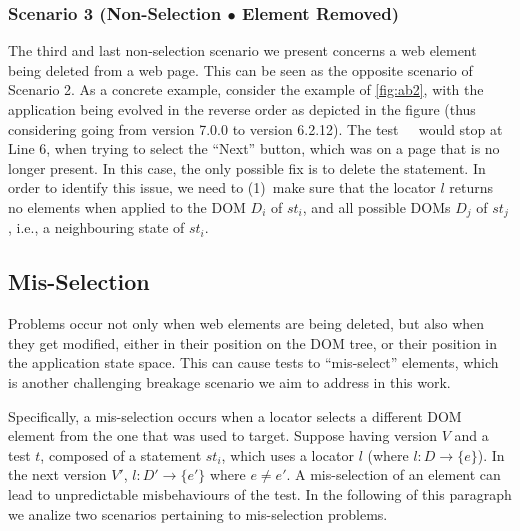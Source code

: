 \subsubsection{Scenario 3 (Non-Selection $\bullet$ Element Removed)} 
%
The third and last non-selection scenario we present concerns a web element being deleted from a web page. This can be seen as the opposite scenario of Scenario 2. 
As a concrete example, consider the example of \autoref{fig:ab2}, with the application being evolved in the reverse order as depicted in the figure (thus considering going from version 7.0.0 to version 6.2.12). The test ~\textcircled{} would stop at Line 6, when trying to select the ``Next'' button, which was on a page that is no longer present. In this case, the only possible fix is to delete the statement.
%
In order to identify this issue, we need to (1)~make sure that the locator $l$ returns no elements when applied to the DOM $D_i$ of $st_i$, and all possible DOMs $D_j$ of $st_j$, i.e., a neighbouring state of $st_i$.

\subsection{Mis-Selection}\label{sec:misselection}
Problems occur not only when web elements are being deleted, but also when they get modified, either in their position on the DOM tree, or their position in the application state space. This can cause tests to ``mis-select'' elements, which is another challenging breakage scenario we aim to address in this work.

Specifically, a mis-selection occurs when a locator selects a different DOM element from the one that was used to target. Suppose having version $V$ and a test $t$, composed of a statement $st_i$, which uses a locator $l$ (where $l: D \rightarrow \{e\}$).
In the next version $V'$, $l: D' \rightarrow \{e'\}$ where $e \ne e'$.
A mis-selection of an element can lead to unpredictable misbehaviours of the test. In the following of this paragraph we analize two scenarios pertaining to mis-selection problems. 

